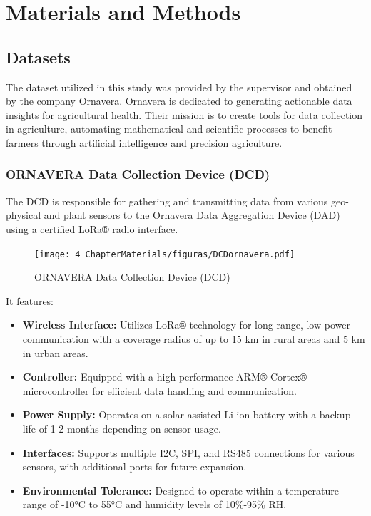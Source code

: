 \chapter{Materials and Methods}

\section{Datasets}

The dataset utilized in this study was provided by the supervisor and obtained by the company Ornavera. Ornavera is dedicated to generating actionable data insights for agricultural health. Their mission is to create tools for data collection in agriculture, automating mathematical and scientific processes to benefit farmers through artificial intelligence and precision agriculture.

\subsection{ORNAVERA Data Collection Device (DCD)}

The DCD is responsible for gathering and transmitting data from various geo-physical and plant sensors to the Ornavera Data Aggregation Device (DAD) using a certified LoRa® radio interface.
\begin{figure}[htbp]
    \centering
    \texttt{[image: 4\_ChapterMaterials/figuras/DCDornavera.pdf]}
    \caption{ORNAVERA Data Collection Device (DCD)\cite{ornavera2020dcd}}
    \end{figure}

It features:
\begin{itemize}
    \item \textbf{Wireless Interface:} Utilizes LoRa® technology for long-range, low-power communication with a coverage radius of up to 15 km in rural areas and 5 km in urban areas.
    \item \textbf{Controller:} Equipped with a high-performance ARM® Cortex® microcontroller for efficient data handling and communication.
    \item \textbf{Power Supply:} Operates on a solar-assisted Li-ion battery with a backup life of 1-2 months depending on sensor usage.
    \item \textbf{Interfaces:} Supports multiple I2C, SPI, and RS485 connections for various sensors, with additional ports for future expansion.
    \item \textbf{Environmental Tolerance:} Designed to operate within a temperature range of -10°C to 55°C and humidity levels of 10\%-95\% RH.
\end{itemize}


